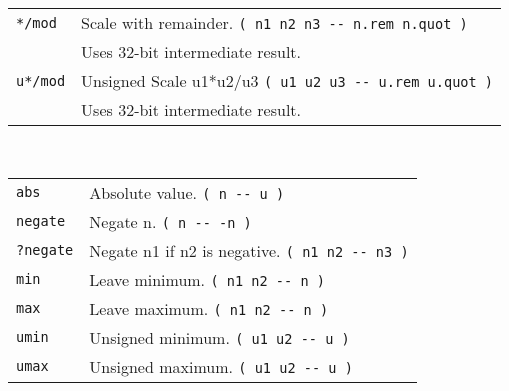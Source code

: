 \documentclass[10pt,landscape,a4paper]{article}
\begin{document}
\begin{multicols}{3}
\begin{tabular}{@{}ll@{}}
\verb!*/mod!  & Scale with remainder. \verb!( n1 n2 n3 -- n.rem n.quot )! \\
              & Uses 32-bit intermediate result. \\
\verb!u*/mod!  & Unsigned Scale u1*u2/u3 \verb!( u1 u2 u3 -- u.rem u.quot )! \\
               & Uses 32-bit intermediate result. \\
\end{tabular} \\
\begin{tabular}{@{}ll@{}}
\verb!abs!  & Absolute value. \verb!( n -- u )! \\
\verb!negate!  & Negate n. \verb!( n -- -n )! \\
\verb!?negate!  & Negate n1 if n2 is negative. \verb!( n1 n2 -- n3 )! \\
\verb!min!  & Leave minimum. \verb!( n1 n2 -- n )! \\
\verb!max!  & Leave maximum. \verb!( n1 n2 -- n )! \\
\verb!umin! & Unsigned minimum. \verb!( u1 u2 -- u )! \\
\verb!umax! & Unsigned maximum. \verb!( u1 u2 -- u )! \\
\end{tabular}


\end{multicols}
\end{document}

